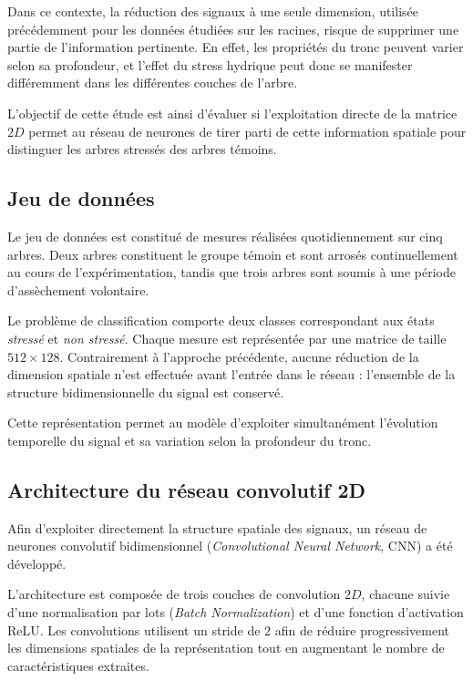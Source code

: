 \documentclass[12pt,a4paper,twoside]{article}
\begin{document}
Dans ce contexte, la réduction des signaux à une seule dimension, utilisée précédemment pour les données étudiées sur les racines, risque de supprimer une partie de l'information pertinente. En effet, les propriétés du tronc peuvent varier selon sa profondeur, et l'effet du stress hydrique peut donc se manifester différemment dans les différentes couches de l'arbre.

L'objectif de cette étude est ainsi d'évaluer si l'exploitation directe de la matrice $2D$ permet au réseau de neurones de tirer parti de cette information spatiale pour distinguer les arbres stressés des arbres témoins.

\subsection{Jeu de données}
\label{subsec:dataset_2d}

Le jeu de données est constitué de mesures réalisées quotidiennement sur cinq arbres. Deux arbres constituent le groupe témoin et sont arrosés continuellement au cours de l'expérimentation, tandis que trois arbres sont soumis à une période d'assèchement volontaire.

Le problème de classification comporte deux classes correspondant aux états \textit{stressé} et \textit{non stressé}. Chaque mesure est représentée par une matrice de taille $512 \times 128$. Contrairement à l'approche précédente, aucune réduction de la dimension spatiale n'est effectuée avant l'entrée dans le réseau : l'ensemble de la structure bidimensionnelle du signal est conservé.

Cette représentation permet au modèle d'exploiter simultanément l'évolution temporelle du signal et sa variation selon la profondeur du tronc.

\subsection{Architecture du réseau convolutif 2D}
\label{subsec:cnn_2d}

Afin d'exploiter directement la structure spatiale des signaux, un réseau de neurones convolutif bidimensionnel (\textit{Convolutional Neural Network}, CNN) a été développé.

L'architecture est composée de trois couches de convolution $2D$, chacune suivie d'une normalisation par lots (\textit{Batch Normalization}) et d'une fonction d'activation ReLU. Les convolutions utilisent un stride de $2$ afin de réduire progressivement les dimensions spatiales de la représentation tout en augmentant le nombre de caractéristiques extraites.
\end{document}
